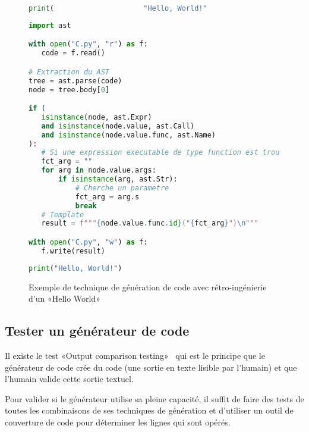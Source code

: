 \begin{figure}
\begin{lstlisting}[language=Python, upquote=true, caption={C mal formaté - fichier C.py de Figure~\ref{fig:exemple_gen_code_retro}}, label={lst:gen_code_retro_c}]
print(                     "Hello, World!"                         )
\end{lstlisting}

\begin{lstlisting}[language=Python, upquote=true, caption={M qui extrait µ$_C$ pour générer C.py de Figure~\ref{fig:exemple_gen_code_retro}}, label={lst:gen_code_retro_m}]
import ast

with open("C.py", "r") as f:
   code = f.read()

# Extraction du AST
tree = ast.parse(code)
node = tree.body[0]

if (
   isinstance(node, ast.Expr)
   and isinstance(node.value, ast.Call)
   and isinstance(node.value.func, ast.Name)
):
   # Si une expression executable de type function est trouve
   fct_arg = ""
   for arg in node.value.args:
       if isinstance(arg, ast.Str):
           # Cherche un parametre
           fct_arg = arg.s
           break
   # Template
   result = f"""{node.value.func.id}("{fct_arg}")\n"""

with open("C.py", "w") as f:
   f.write(result)
\end{lstlisting}

\begin{lstlisting}[language=Python, upquote=true, caption={C corrigé - fichier C.py de Figure~\ref{fig:exemple_gen_code_retro}}, label={lst:gen_code_retro_new_c}]
print("Hello, World!")
\end{lstlisting}
\caption{Exemple de technique de génération de code avec rétro-ingénierie d'un «Hello World»}
\label{fig:exemple_gen_code_retro}
\end{figure}

\subsection{Tester un générateur de code}

Il existe le test «Output comparison testing»~\cite{wikipedia_test_informatique} qui est le principe que le générateur de code crée du code (une sortie en texte lisible par l'humain) et que l'humain valide cette sortie textuel.

Pour valider si le générateur utilise sa pleine capacité, il suffit de faire des tests de toutes les combinaisons de ses techniques de génération et d'utiliser un outil de couverture de code pour déterminer les lignes qui sont opérés.

